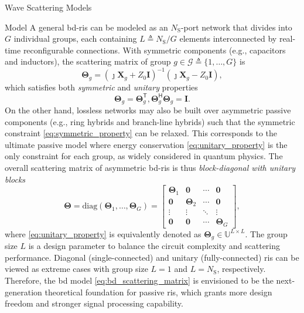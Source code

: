 \begin{section}{}
\begin{subsection}{Wave Scattering Models}
\begin{subsubsection}{ Model}
			A general \gls{bd}-\gls{ris} can be modeled as an $N_\mathrm{S}$-port network that divides into $G$ individual groups, each containing $L \triangleq N_\mathrm{S} / G$ elements interconnected by real-time reconfigurable connections.
			With symmetric components (e.g., capacitors and inductors), the scattering matrix of group $g \in \mathcal{G} \triangleq \{1, \ldots, G\}$ is \cite{Shen2020a}
			\begin{equation}
				\mathbf{\Theta}_g = (\jmath \mathbf{X}_g + Z_0 \mathbf{I})^{-1} (\jmath \mathbf{X}_g - Z_0 \mathbf{I}),
			\end{equation}
			which satisfies both \emph{symmetric} and \emph{unitary} properties
			\begin{subequations}
				\begin{equation}
					\mathbf{\Theta}_g = \mathbf{\Theta}_g^\mathsf{T},
					\label{eq:symmetric_property}
				\end{equation}
				\begin{equation}
					\mathbf{\Theta}_g^\mathsf{H} \mathbf{\Theta}_g = \mathbf{I}.
					\label{eq:unitary_property}
				\end{equation}
			\end{subequations}
			On the other hand, lossless networks may also be built over asymmetric passive components (e.g., ring hybrids and branch-line hybrids) \cite{Ahn2006} such that the symmetric constraint \eqref{eq:symmetric_property} can be relaxed.
			This corresponds to the ultimate passive model where energy conservation \eqref{eq:unitary_property} is the only constraint for each group, as widely considered in quantum physics.
			The overall scattering matrix of asymmetric \gls{bd}-\gls{ris} is thus \emph{block-diagonal with unitary blocks}
			\begin{equation}
				\mathbf{\Theta} = \mathrm{diag}(\mathbf{\Theta}_1,\ldots,\mathbf{\Theta}_G) =
				\begin{bmatrix}
					\mathbf{\Theta}_1 & \mathbf{0} & \cdots & \mathbf{0} \\
					\mathbf{0} & \mathbf{\Theta}_2 & \cdots & \mathbf{0} \\
					\vdots & \vdots & \ddots & \vdots \\
					\mathbf{0} & \mathbf{0} & \cdots & \mathbf{\Theta}_G
				\end{bmatrix},
				\label{eq:bd_scattering_matrix}
			\end{equation}
			where \eqref{eq:unitary_property} is equivalently denoted as $\mathbf{\Theta}_g \in \mathbb{U}^{L \times L}$.
			The group size $L$ is a design parameter to balance the circuit complexity and scattering performance.
			Diagonal (single-connected) and unitary (fully-connected) \gls{ris} can be viewed as extreme cases with group size $L=1$ and $L=N_\mathrm{S}$, respectively.
			Therefore, the \gls{bd} model \eqref{eq:bd_scattering_matrix} is envisioned to be the next-generation theoretical foundation for passive \gls{ris}, which grants more design freedom and stronger signal processing capability.


\end{subsubsection}
\end{subsection}
\end{section}

